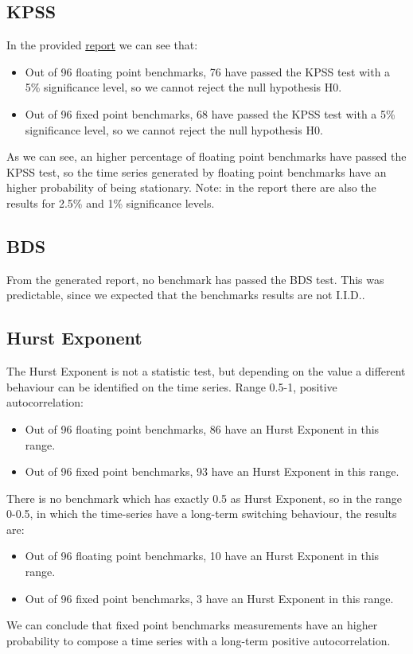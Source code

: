 \subsection{KPSS}
In the provided \href{../statistics/tests\_results.txt}{report} we can see that:
\begin{itemize}
	\item Out of 96 floating point benchmarks, 76 have passed the KPSS test with a 5\% significance level, so we cannot reject the null hypothesis H0.
	\item Out of 96 fixed point benchmarks, 68 have passed the KPSS test with a 5\% significance level, so we cannot reject the null hypothesis H0.
\end{itemize}
As we can see, an higher percentage of floating point benchmarks have passed the KPSS test, so the time series generated by floating point benchmarks have an higher probability of being stationary.\newline
Note: in the report there are also the results for 2.5\% and 1\% significance levels.

\subsection{BDS}
From the generated report, no benchmark has passed the BDS test. This was predictable, since we expected that the benchmarks results are not I.I.D..

\subsection{Hurst Exponent}
The Hurst Exponent is not a statistic test, but depending on the value a different behaviour can be identified on the time series.\newline
Range 0.5-1, positive autocorrelation:
\begin{itemize}
	\item Out of 96 floating point benchmarks, 86 have an Hurst Exponent in this range.
	\item Out of 96 fixed point benchmarks, 93 have an Hurst Exponent in this range.
\end{itemize}
There is no benchmark which has exactly 0.5 as Hurst Exponent, so in the range 0-0.5, in which the time-series have a long-term switching behaviour, the results are:
\begin{itemize}
	\item Out of 96 floating point benchmarks, 10 have an Hurst Exponent in this range.
	\item Out of 96 fixed point benchmarks, 3 have an Hurst Exponent in this range.
\end{itemize}
We can conclude that fixed point benchmarks measurements have an higher probability to compose a time series with a long-term positive autocorrelation.
\clearpage
